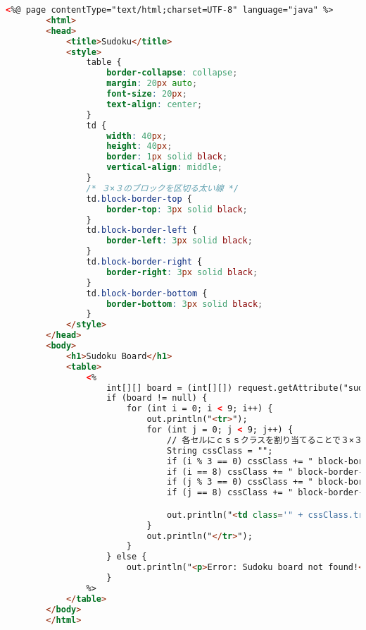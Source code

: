 \documentclass[a4paper,10pt]{jsarticle}
\begin{document}
      \begin{lstlisting}[caption=ナンプレの盤面を再現,label=fix_banmen,language=HTML]
        <%@ page contentType="text/html;charset=UTF-8" language="java" %>
        <html>
        <head>
            <title>Sudoku</title>
            <style>
                table {
                    border-collapse: collapse;
                    margin: 20px auto;
                    font-size: 20px;
                    text-align: center;
                }
                td {
                    width: 40px;
                    height: 40px;
                    border: 1px solid black;
                    vertical-align: middle;
                }
                /* ３×３のブロックを区切る太い線 */
                td.block-border-top {
                    border-top: 3px solid black;
                }
                td.block-border-left {
                    border-left: 3px solid black;
                }
                td.block-border-right {
                    border-right: 3px solid black;
                }
                td.block-border-bottom {
                    border-bottom: 3px solid black;
                }
            </style>
        </head>
        <body>
            <h1>Sudoku Board</h1>
            <table>
                <%
                    int[][] board = (int[][]) request.getAttribute("sudokuBoard");
                    if (board != null) {
                        for (int i = 0; i < 9; i++) {
                            out.println("<tr>");
                            for (int j = 0; j < 9; j++) {
                                // 各セルにｃｓｓクラスを割り当てることで３×３の区切り線を作成
                                String cssClass = "";
                                if (i % 3 == 0) cssClass += " block-border-top";
                                if (i == 8) cssClass += " block-border-bottom";
                                if (j % 3 == 0) cssClass += " block-border-left";
                                if (j == 8) cssClass += " block-border-right";

                                out.println("<td class='" + cssClass.trim() + "'>" + (board[i][j] == 0 ? "" : board[i][j]) + "</td>");
                            }
                            out.println("</tr>");
                        }
                    } else {
                        out.println("<p>Error: Sudoku board not found!</p>");
                    }
                %>
            </table>
        </body>
        </html>
      \end{lstlisting}
\end{document}

